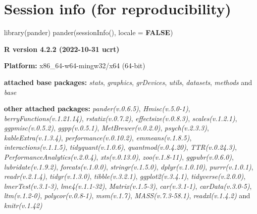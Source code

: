 \documentclass[
  bookmarksnumbered]{article}
\newenvironment{Shaded}{\begin{snugshade}}{\end{snugshade}}
\newcommand{\AttributeTok}[1]{\textcolor[rgb]{0.80,0.80,0.80}{#1}}
\newcommand{\ConstantTok}[1]{\textcolor[rgb]{0.86,0.64,0.64}{\textbf{#1}}}
\newcommand{\FunctionTok}[1]{\textcolor[rgb]{0.94,0.94,0.56}{#1}}
\newcommand{\NormalTok}[1]{\textcolor[rgb]{0.80,0.80,0.80}{#1}}
\begin{document}
\hypertarget{session}{%
\section{Session info (for reproducibility)}\label{session}}

\begin{Shaded}
\begin{Highlighting}[]
\FunctionTok{library}\NormalTok{(pander)}
\FunctionTok{pander}\NormalTok{(}\FunctionTok{sessionInfo}\NormalTok{(), }\AttributeTok{locale =} \ConstantTok{FALSE}\NormalTok{)}
\end{Highlighting}
\end{Shaded}

\textbf{R version 4.2.2 (2022-10-31 ucrt)}

\textbf{Platform:} x86\_64-w64-mingw32/x64 (64-bit)

\textbf{attached base packages:}
\emph{stats}, \emph{graphics}, \emph{grDevices}, \emph{utils}, \emph{datasets}, \emph{methods} and \emph{base}

\textbf{other attached packages:}
\emph{pander(v.0.6.5)}, \emph{Hmisc(v.5.0-1)}, \emph{berryFunctions(v.1.21.14)}, \emph{rstatix(v.0.7.2)}, \emph{effectsize(v.0.8.3)}, \emph{scales(v.1.2.1)}, \emph{ggpmisc(v.0.5.2)}, \emph{ggpp(v.0.5.1)}, \emph{MetBrewer(v.0.2.0)}, \emph{psych(v.2.3.3)}, \emph{kableExtra(v.1.3.4)}, \emph{performance(v.0.10.2)}, \emph{emmeans(v.1.8.5)}, \emph{interactions(v.1.1.5)}, \emph{tidyquant(v.1.0.6)}, \emph{quantmod(v.0.4.20)}, \emph{TTR(v.0.24.3)}, \emph{PerformanceAnalytics(v.2.0.4)}, \emph{xts(v.0.13.0)}, \emph{zoo(v.1.8-11)}, \emph{ggpubr(v.0.6.0)}, \emph{lubridate(v.1.9.2)}, \emph{forcats(v.1.0.0)}, \emph{stringr(v.1.5.0)}, \emph{dplyr(v.1.0.10)}, \emph{purrr(v.1.0.1)}, \emph{readr(v.2.1.4)}, \emph{tidyr(v.1.3.0)}, \emph{tibble(v.3.2.1)}, \emph{ggplot2(v.3.4.1)}, \emph{tidyverse(v.2.0.0)}, \emph{lmerTest(v.3.1-3)}, \emph{lme4(v.1.1-32)}, \emph{Matrix(v.1.5-3)}, \emph{car(v.3.1-1)}, \emph{carData(v.3.0-5)}, \emph{ltm(v.1.2-0)}, \emph{polycor(v.0.8-1)}, \emph{msm(v.1.7)}, \emph{MASS(v.7.3-58.1)}, \emph{readxl(v.1.4.2)} and \emph{knitr(v.1.42)}
\end{document}
